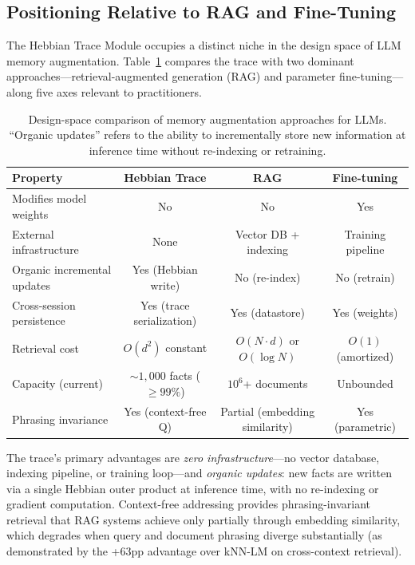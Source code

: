 \documentclass[11pt,a4paper]{article}
\begin{document}
\subsection{Positioning Relative to RAG and Fine-Tuning}

The Hebbian Trace Module occupies a distinct niche in the design space of LLM memory augmentation. Table~\ref{tab:positioning} compares the trace with two dominant approaches---retrieval-augmented generation (RAG) and parameter fine-tuning---along five axes relevant to practitioners.

\begin{table}[t]
  \centering
  \caption{Design-space comparison of memory augmentation approaches for LLMs. ``Organic updates'' refers to the ability to incrementally store new information at inference time without re-indexing or retraining.}
  \label{tab:positioning}
  \begin{tabular}{@{}lccc@{}}
    \toprule
    Property & Hebbian Trace & RAG & Fine-tuning \\
    \midrule
    Modifies model weights     & No  & No  & Yes \\
    External infrastructure    & None & Vector DB + indexing & Training pipeline \\
    Organic incremental updates & Yes (Hebbian write) & No (re-index) & No (retrain) \\
    Cross-session persistence  & Yes (trace serialization) & Yes (datastore) & Yes (weights) \\
    Retrieval cost              & $O(d^2)$ constant & $O(N \cdot d)$ or $O(\log N)$ & $O(1)$ (amortized) \\
    Capacity (current)         & ${\sim}1{,}000$ facts (${\geq}99\%$) & $10^6$+ documents & Unbounded \\
    Phrasing invariance        & Yes (context-free Q) & Partial (embedding similarity) & Yes (parametric) \\
    \bottomrule
  \end{tabular}
\end{table}

The trace's primary advantages are \emph{zero infrastructure}---no vector database, indexing pipeline, or training loop---and \emph{organic updates}: new facts are written via a single Hebbian outer product at inference time, with no re-indexing or gradient computation. Context-free addressing provides phrasing-invariant retrieval that RAG systems achieve only partially through embedding similarity, which degrades when query and document phrasing diverge substantially (as demonstrated by the +63pp advantage over kNN-LM on cross-context retrieval).
\end{document}
